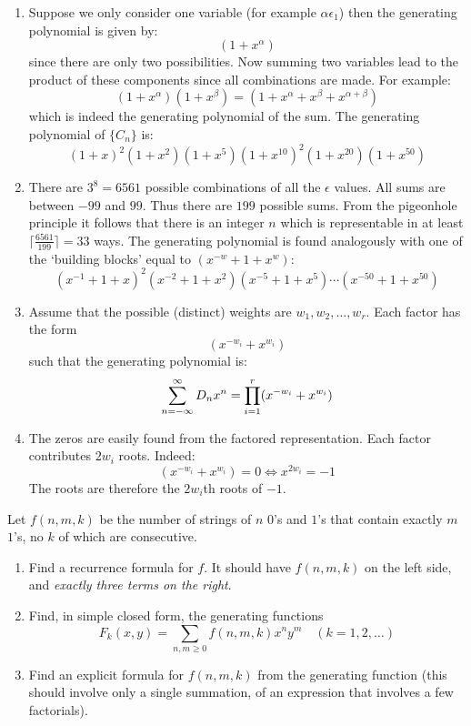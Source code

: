 \begin{solution}
    \begin{enumerate}[label=(\alph*)]
        \item Suppose we only consider one variable (for example $\alpha\epsilon_1$) then the generating polynomial is given by:
        \[
            (1+x^\alpha)
        \]
        since there are only two possibilities. Now summing two variables lead to the product of these components since all combinations are made. For example:
        \[
            (1+x^\alpha)(1+x^\beta) = (1 + x^\alpha + x^\beta + x^{\alpha+\beta})
        \]
        which is indeed the generating polynomial of the sum. The generating polynomial of $\{C_n\}$ is:
        \[
            (1+x)^2(1+x^2)(1+x^5)(1+x^{10})^2(1+x^{20})(1+x^{50})
        \]
        \item There are $3^8 = 6561$ possible combinations of all the $\epsilon$ values. All sums are between $-99$ and $99$. Thus there are $199$ possible sums. From the pigeonhole principle it follows that there is an integer $n$ which is representable in at least $\lceil \frac{6561}{199}\rceil = 33$ ways. The generating polynomial is found analogously with one of the `building blocks' equal to $(x^{-w} + 1 + x^w)$:
        \[
            (x^{-1}+1+x)^2 (x^{-2} + 1 + x^2)(x^{-5} + 1 + x^5)\cdots(x^{-50} + 1 + x^{50})
        \]
        \item Assume that the possible (distinct) weights are $w_1, w_2, \ldots, w_r$. Each factor has the form
        \[
            (x^{-w_i} + x^{w_i})
        \]
        such that the generating polynomial is:
        \[
            \sum_{n=-\infty}^\infty D_n x^n = \prod_{i=1}^r (x^{-w_i} + x^{w_i})
        \]
        \item The zeros are easily found from the factored representation. Each factor contributes $2w_i$ roots. Indeed:
        \[
            (x^{-w_i} + x^{w_i}) = 0 \Leftrightarrow x^{2w_i} = -1
        \]
        The roots are therefore the $2w_i$th roots of $-1$.
    \end{enumerate}
\end{solution}

\begin{exercise}
    Let $f(n,m,k)$ be the number of strings of $n$ $0$'s and $1$'s that contain exactly $m$ $1$'s, no $k$ of which are consecutive.
    \begin{enumerate}[label=(\alph*)]
        \item Find a recurrence formula for $f$. It should have $f(n,m,k)$ on the left side, and \textit{exactly three terms on the right}.
        \item Find, in simple closed form, the generating functions
        \[
            F_k(x,y) = \sum_{n,m\geq 0} f(n,m,k)x^ny^m \quad (k=1,2,\ldots)
        \]
        \item Find an explicit formula for $f(n,m,k)$ from the generating function (this should involve only a single summation, of an expression that involves a few factorials).
    \end{enumerate}
\end{exercise}

